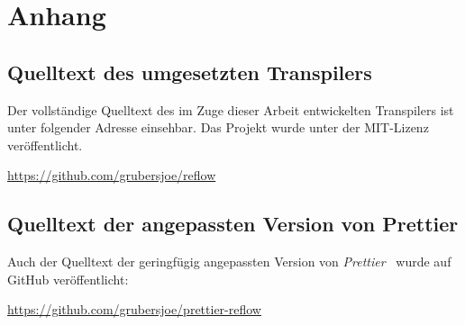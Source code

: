 \appendix
\chapter{Anhang}

\section{Quelltext des umgesetzten Transpilers}

Der vollständige Quelltext des im Zuge dieser Arbeit entwickelten Transpilers ist unter folgender Adresse einsehbar. Das Projekt wurde unter der MIT-Lizenz~\autocite{LICENSE:MIT} veröffentlicht.

\url{https://github.com/grubersjoe/reflow}

\section{Quelltext der angepassten Version von Prettier}
\label{appendix:prettier}

Auch der Quelltext der geringfügig angepassten Version von \textit{Prettier}~\autocite{SOFTWARE:PRETTIER} wurde auf GitHub veröffentlicht:

\url{https://github.com/grubersjoe/prettier-reflow}

